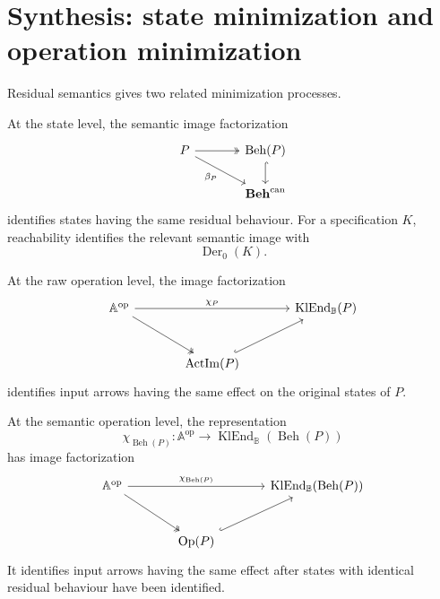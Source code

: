 \section{Synthesis: state minimization and operation minimization}
\label{sec:to-synthesis}

Residual semantics gives two related minimization processes.

At the state level, the semantic image factorization
\[
\begin{tikzcd}[column sep=large]
    P
        \arrow[r, two heads]
        \arrow[dr, "\beta_P"']
    &
    \operatorname{Beh}(P)
        \arrow[d, hook]
    \\
    &
    \mathbf{Beh}^{\mathrm{can}}
\end{tikzcd}
\]
identifies states having the same residual behaviour. For a specification
\(K\), reachability identifies the relevant semantic image with
\[
    \operatorname{Der}_0(K).
\]

At the raw operation level, the image factorization
\[
\begin{tikzcd}[column sep=large, row sep=large]
    \mathbb A^{\mathrm{op}}
        \arrow[rr, "\chi_P"]
        \arrow[dr, two heads]
    &&
    \operatorname{KlEnd}_{\mathbb B}(P)
    \\
    &
    \operatorname{ActIm}(P)
        \arrow[ur, hook]
    &
\end{tikzcd}
\]
identifies input arrows having the same effect on the original states of
\(P\).

At the semantic operation level, the representation
\[
    \chi_{\operatorname{Beh}(P)}:
    \mathbb A^{\mathrm{op}}
    \to
    \operatorname{KlEnd}_{\mathbb B}(\operatorname{Beh}(P))
\]
has image factorization
\[
\begin{tikzcd}[column sep=large, row sep=large]
    \mathbb A^{\mathrm{op}}
        \arrow[rr, "\chi_{\operatorname{Beh}(P)}"]
        \arrow[dr, two heads]
    &&
    \operatorname{KlEnd}_{\mathbb B}(\operatorname{Beh}(P))
    \\
    &
    \operatorname{Op}(P)
        \arrow[ur, hook]
    &
\end{tikzcd}
\]
It identifies input arrows having the same effect after states with identical
residual behaviour have been identified.

